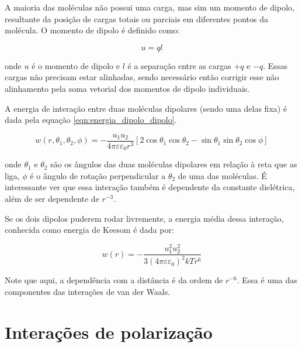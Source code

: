 	A maioria das moléculas não possui uma carga, mas sim um momento de dipolo, resultante da posição de cargas totais ou parciais em diferentes pontos da molécula. O momento de dipolo é definido como:
	
	\begin{equation}
		u = ql
		\label{eqn:momento_dipolo}
	\end{equation}
	
	\noindent onde \(u\) é o momento de dipolo e \(l\) é a separação entre as cargas \(+q\) e \(-q\). Essas cargas não precisam estar alinhadas, sendo necessário então corrigir esse não alinhamento pela soma vetorial dos momentos de dipolo individuais.
	
	A energia de interação entre duas moléculas dipolares (sendo uma delas fixa) é dada pela equação \ref{eqn:energia_dipolo_dipolo}.
	
	\begin{equation}
		w \left( r , \theta _ { 1 } , \theta _ { 2 } , \phi \right) = - \frac { u _ { 1 } u _ { 2 } } { 4 \pi \varepsilon \varepsilon _ { 0 } r ^ { 3 } } \left[ 2 \cos \theta _ { 1 } \cos \theta _ { 2 } - \sin \theta _ { 1 } \sin \theta _ { 2 } \cos \phi \right]
		\label{eqn:energia_dipolo_dipolo}
	\end{equation}
	
	\noindent onde \(\theta_{ 1 }\) e \(\theta_{ 2 }\) são os ângulos das duas moléculas dipolares em relação à reta que as liga, \(\phi\) é o ângulo de rotação perpendicular a \(\theta_{ 2 }\) de uma das moléculas. É interessante ver que essa interação também é dependente da constante dielétrica, além de ser dependente de \(r^{-3}\).  %
	
	Se os dois dipolos puderem rodar livremente, a energia média dessa interação, conhecida como energia de Keesom é dada por:
	
	\begin{equation}
		w(r) = - \dfrac{u _ { 1 } ^ { 2 } u _ { 2 } ^ { 2 } }{ 3 \left( 4 \pi \varepsilon \varepsilon _ { 0 } \right) ^ { 2 } k T r ^ { 6 } }
		\label{eqn:energia_Keesom}
	\end{equation}
	
	Note que aqui, a dependência com a distância é da ordem de \(r^{-6}\). Essa é uma das componentes das interações de van der Waals.
	
	\section{Interações de polarização}
	
